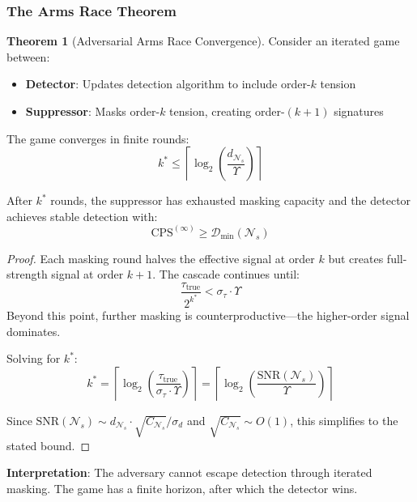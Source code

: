 \documentclass[12pt,a4paper]{article}
\theoremstyle{definition}
\newtheorem{theorem}{Theorem}[section]
\theoremstyle{remark}
\newcommand{\NS}{\mathcal{N}_s}          %
\newcommand{\Yharim}{\Upsilon}           %
\begin{document}
\subsubsection{The Arms Race Theorem}

\begin{theorem}[Adversarial Arms Race Convergence]
\label{thm:arms-race}
Consider an iterated game between:
\begin{itemize}
    \item \textbf{Detector}: Updates detection algorithm to include order-$k$ tension
    \item \textbf{Suppressor}: Masks order-$k$ tension, creating order-$(k+1)$ signatures
\end{itemize}

The game converges in finite rounds:
\begin{equation}
    \boxed{
    k^* \leq \left\lceil \log_2 \left( \frac{d_{\NS}}{\Yharim} \right) \right\rceil
    }
\end{equation}

After $k^*$ rounds, the suppressor has exhausted masking capacity and the detector achieves stable detection with:
\begin{equation}
    \text{CPS}^{(\infty)} \geq \mathcal{D}_{\min}(\NS)
\end{equation}
\end{theorem}

\begin{proof}
Each masking round halves the effective signal at order $k$ but creates full-strength signal at order $k+1$. The cascade continues until:
\begin{equation}
    \frac{\tau_{\text{true}}}{2^{k^*}} < \sigma_\tau \cdot \Yharim
\end{equation}
Beyond this point, further masking is counterproductive—the higher-order signal dominates.

Solving for $k^*$:
\begin{equation}
    k^* = \left\lceil \log_2 \left( \frac{\tau_{\text{true}}}{\sigma_\tau \cdot \Yharim} \right) \right\rceil = \left\lceil \log_2 \left( \frac{\text{SNR}(\NS)}{\Yharim} \right) \right\rceil
\end{equation}

Since $\text{SNR}(\NS) \sim d_{\NS} \cdot \sqrt{C_{\NS}} / \sigma_d$ and $\sqrt{C_{\NS}} \sim O(1)$, this simplifies to the stated bound.
\end{proof}

\textbf{Interpretation}: The adversary cannot escape detection through iterated masking. The game has a finite horizon, after which the detector wins.
\end{document}
